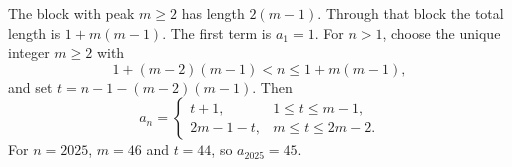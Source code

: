 The block with peak $m\ge2$ has length $2(m-1)$. Through that block the total length is $1+m(m-1)$. The first term is $a_1=1$. For $n>1$, choose the unique integer $m\ge2$ with
\[
1+(m-2)(m-1)<n\le1+m(m-1),
\]
and set $t=n-1-(m-2)(m-1)$. Then
\[
a_n=\begin{cases}t+1,&1\le t\le m-1,\\2m-1-t,&m\le t\le2m-2.\end{cases}
\]
For $n=2025$, $m=46$ and $t=44$, so $a_{2025}=\boxed{45}$.
